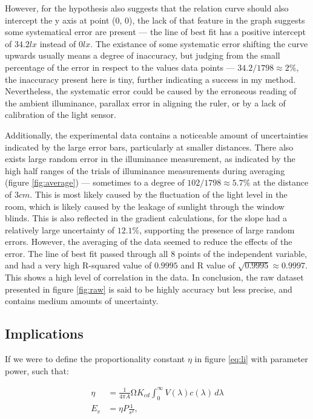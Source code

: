 \documentclass[a4paper,12pt]{article}
\begin{document}
However, for the hypothesis also suggests that the relation curve should also intercept the y axis at point (0, 0), the lack of that feature in the graph suggests some systematical error are present --- the line of best fit has a positive intercept of $34.2 \si{lx}$ instead of $0 \si{lx}$. The existance of some systematic error shifting the curve upwards usually means a degree of inaccuracy, but judging from the small percentage of the error in respect to the values data points --- $34.2 / 1798 \approx 2\%$, the inaccuracy present here is tiny, further indicating a success in my method. Nevertheless, the systematic error could be caused by the erroneous reading of the ambient illuminance, parallax error in aligning the ruler, or by a lack of calibration of the light sensor.

Additionally, the experimental data contains a noticeable amount of uncertainties indicated by the large error bars, particularly at smaller distances. There also exists large random error in the illuminance measurement, as indicated by the high half ranges of the trials of illuminance measurements during averaging (figure \ref{fig:average}) --- sometimes to a degree of $102/1798 \approx 5.7\%$ at the distance of $3\si{cm}$. This is most likely caused by the fluctuation of the light level in the room, which is likely caused by the leakage of sunlight through the window blinds. This is also reflected in the gradient calculations, for the slope had a relatively large uncertainty of $12.1\%$, supporting the presence of large random errors. However, the averaging of the data seemed to reduce the effects of the error. The line of best fit passed through all 8 points of the independent variable, and had a very high R-squared value of $0.9995$ and R value of $\sqrt{0.9995} \approx 0.9997$. This shows a high level of correlation in the data. In conclusion, the raw dataset presented in figure \ref{fig:raw} is said to be highly accuracy but less precise, and contains medium amounts of uncertainty.

\subsection{Implications}

If we were to define the proportionality constant $\eta$ in figure \ref{eq:li} with parameter power, such that:

\begin{align*}
    \eta &= \frac{1}{4\pi A} \si{\ohm} K_{cd} \int_{0}^{\infty} V(\lambda) c(\lambda) \, d\lambda\\
    E_v &= \eta P \frac{1}{s^2},
\end{align*}
\end{document}
